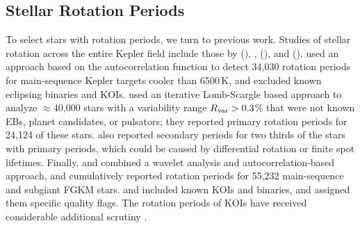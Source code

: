\documentclass[11pt,twocolumn,tighten]{aastex63}
\begin{document}
\subsection{Stellar Rotation Periods}
\label{subsec:rotsel}

To select stars with rotation periods, we turn to previous work.
Studies of stellar rotation across the entire Kepler field include
those by \citet{McQuillan_2014} (),
\citet{Reinhold_2015}, \citet{Santos_2019} (),
and \citet{Santos_2021} ().
 used an approach based on the
autocorrelation function to detect 34{,}030 rotation periods for
main-sequence Kepler targets cooler than 6500\,K, and excluded known
eclipsing binaries and KOIs.  \citet{Reinhold_2015} used an iterative
Lomb-Scargle based approach to analyze $\approx$40{,}000 stars with a
variability range $R_{\rm var}>0.3$\% that were not known EBs, planet
candidates, or pulsators; they reported primary rotation periods for
24{,}124 of these stars.  \citet{Reinhold_2015} also reported
secondary periods for two thirds of the stars with primary periods,
which could be caused by differential rotation or finite spot
lifetimes.  Finally,  and
 combined a wavelet analysis and
autocorrelation-based approach, and cumulatively reported rotation
periods for 55{,}232 main-sequence and subgiant FGKM stars.
 and  included known
KOIs and binaries, and assigned them specific quality flags.  The
rotation periods of KOIs have received considerable additional
scrutiny
\citep[e.g.][]{Walkowicz_2013,Mazeh_2015,Angus_2018,David_2021}.
\end{document}
